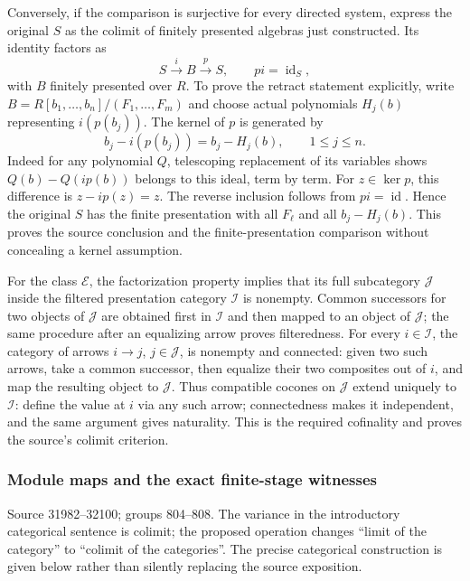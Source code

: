 Conversely, if the comparison is surjective for every directed system, express the original \(S\) as the colimit of finitely presented algebras just constructed. Its identity factors as \[
S\xrightarrow{i}B\xrightarrow{p}S,\qquad pi=\operatorname{id}_S,
\] with \(B\) finitely presented over \(R\). To prove the retract statement explicitly, write \(B=R[b_1,\ldots,b_n]/(F_1,\ldots,F_m)\) and choose actual polynomials \(H_j(b)\) representing \(i(p(b_j))\). The kernel of \(p\) is generated by \[
b_j-i(p(b_j))=b_j-H_j(b),\qquad 1\le j\le n.
\] Indeed for any polynomial \(Q\), telescoping replacement of its variables shows \(Q(b)-Q(i p(b))\) belongs to this ideal, term by term. For \(z\in\ker p\), this difference is \(z-i p(z)=z\). The reverse inclusion follows from \(pi=\operatorname{id}\). Hence the original \(S\) has the finite presentation with all \(F_\ell\) and all \(b_j-H_j(b)\). This proves the source conclusion and the finite-presentation comparison without concealing a kernel assumption.

For the class \(\mathcal E\), the factorization property implies that its full subcategory \(\mathcal J\) inside the filtered presentation category \(\mathcal I\) is nonempty. Common successors for two objects of \(\mathcal J\) are obtained first in \(\mathcal I\) and then mapped to an object of \(\mathcal J\); the same procedure after an equalizing arrow proves filteredness. For every \(i\in\mathcal I\), the category of arrows \(i\to j\), \(j\in\mathcal J\), is nonempty and connected: given two such arrows, take a common successor, then equalize their two composites out of \(i\), and map the resulting object to \(\mathcal J\). Thus compatible cocones on \(\mathcal J\) extend uniquely to \(\mathcal I\): define the value at \(i\) via any such arrow; connectedness makes it independent, and the same argument gives naturality. This is the required cofinality and proves the source's colimit criterion.

\subsubsection{Module maps and the exact finite-stage witnesses}\label{module-maps-and-the-exact-finite-stage-witnesses}

Source 31982--32100; groups 804--808. The variance in the introductory categorical sentence is colimit; the proposed operation changes ``limit of the category'' to ``colimit of the categories''. The precise categorical construction is given below rather than silently replacing the source exposition.

